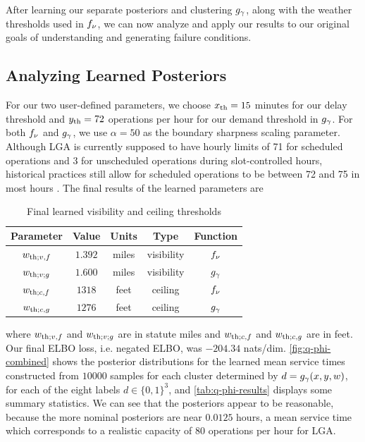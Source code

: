 After learning our separate posteriors and clustering $g_{\gamma}$, along with the weather thresholds used in $f_{\nu}$, we can now analyze and apply our results to our original goals of understanding and generating failure conditions.

\subsection{Analyzing Learned Posteriors}

For our two user-defined parameters, we choose $x_{\mathrm{th}}=15$ minutes for our delay threshold and $y_{\mathrm{th}}=72$ operations per hour for our demand threshold in $g_{\gamma}$. For both $f_{\nu}$ and $g_{\gamma}$, we use $\alpha=50$ as the boundary sharpness scaling parameter. Although LGA is currently supposed to have hourly limits of 71 for scheduled operations and 3 for unscheduled operations during slot-controlled hours, historical practices still allow for scheduled operations to be between 72 and 75 in most hours \cite{faa_lga_2024}. The final results of the learned parameters are
\begin{table}[htb!]
    \centering
    \begin{tabular}{|c||c|c||c|c|}
        \hline
        Parameter & Value & Units & Type & Function\\
        \hline\hline
        $w_{\mathrm{th};v,f}$ & $1.392$ & miles & visibility & $f_{\nu}$ \\
        \hline
        $w_{\mathrm{th};v;g}$ & $1.600$ & miles & visibility & $g_{\gamma}$ \\
        \hline\hline
        $w_{\mathrm{th};c,f}$ & $1318$ & feet & ceiling & $f_{\nu}$ \\
        \hline
        $w_{\mathrm{th};c,g}$ & $1276$ & feet & ceiling & $g_{\gamma}$ \\
        \hline
    \end{tabular}
    \caption{Final learned visibility and ceiling thresholds}
    \label{tab:learned-thresholds}
\end{table}

where $w_{\mathrm{th};v,f}$ and $w_{\mathrm{th};v;g}$ are in statute miles and $w_{\mathrm{th};c,f}$ and $w_{\mathrm{th};c,g}$ are in feet. Our final ELBO loss, i.e. negated ELBO, was $-204.34$ nats/dim. \cref{fig:q-phi-combined} shows the posterior distributions for the learned mean service times constructed from $10000$ samples for each cluster determined by $d= \gvd{x,y,w}$, for each of the eight labels $d\in \{0,1\}^3$, and \cref{tab:q-phi-results} displays some summary statistics. We can see that the posteriors appear to be reasonable, because the more nominal posteriors are near $0.0125$ hours, a mean service time which corresponds to a realistic capacity of $80$ operations per hour for LGA.

